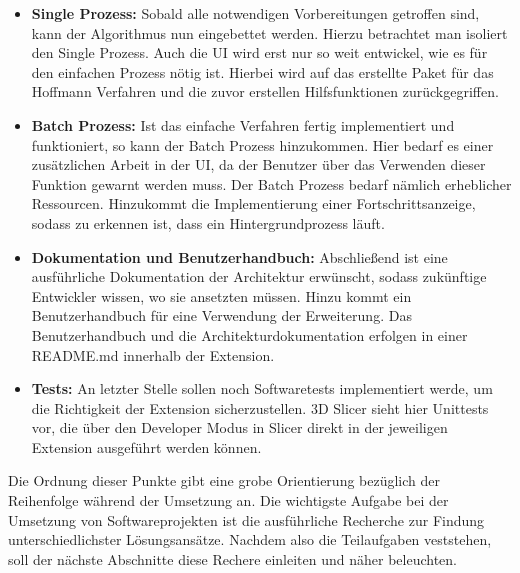 \begin{itemize}
	\item \textbf{Single Prozess:} Sobald alle notwendigen Vorbereitungen
		getroffen sind, kann der Algorithmus nun eingebettet werden. Hierzu
		betrachtet man isoliert den Single Prozess. Auch die UI wird erst nur so weit
		entwickel, wie es für den einfachen Prozess nötig ist. Hierbei wird auf das erstellte
		Paket für das Hoffmann Verfahren und die zuvor erstellen Hilfsfunktionen zurückgegriffen.

	\item \textbf{Batch Prozess:} Ist das einfache Verfahren fertig implementiert
		und funktioniert, so kann der Batch Prozess hinzukommen. Hier bedarf es
		einer zusätzlichen Arbeit in der UI, da der Benutzer über das Verwenden dieser
		Funktion gewarnt werden muss. Der Batch Prozess bedarf nämlich erheblicher
		Ressourcen. Hinzukommt die Implementierung einer Fortschrittsanzeige, sodass
		zu erkennen ist, dass ein Hintergrundprozess läuft.

	\item \textbf{Dokumentation und Benutzerhandbuch:} Abschließend ist eine
		ausführliche Dokumentation der Architektur erwünscht, sodass zukünftige Entwickler
		wissen, wo sie ansetzten müssen. Hinzu kommt ein Benutzerhandbuch für eine Verwendung
		der Erweiterung. Das Benutzerhandbuch und die Architekturdokumentation
		erfolgen in einer README.md innerhalb der Extension.

	\item \textbf{Tests:} An letzter Stelle sollen noch Softwaretests
		implementiert werde, um die Richtigkeit der Extension sicherzustellen. 3D
		Slicer sieht hier Unittests vor, die über den Developer Modus in Slicer direkt
		in der jeweiligen Extension ausgeführt werden können.
\end{itemize}

Die Ordnung dieser Punkte gibt eine grobe Orientierung bezüglich der Reihenfolge
während der Umsetzung an. Die wichtigste Aufgabe bei der Umsetzung von
Softwareprojekten ist die ausführliche Recherche zur Findung unterschiedlichster
Lösungsansätze. Nachdem also die Teilaufgaben veststehen, soll der nächste
Abschnitte diese Rechere einleiten und näher beleuchten.


